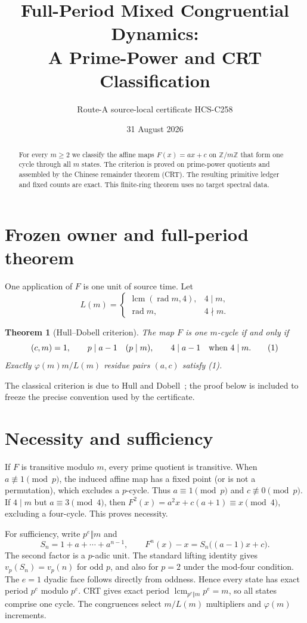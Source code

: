 \documentclass[10pt]{article}
\title{Full-Period Mixed Congruential Dynamics:\\
A Prime-Power and CRT Classification}
\author{Route-A source-local certificate HCS-C258}
\date{31 August 2026}
\newtheorem{theorem}{Theorem}
\newcommand{\Z}{\mathbb Z}
\begin{document}
\maketitle
\begin{abstract}
For every $m\ge2$ we classify the affine maps
$F(x)=ax+c$ on $\Z/m\Z$ that form one cycle through all $m$ states.
The criterion is proved on prime-power quotients and assembled by the Chinese
remainder theorem (CRT).  The resulting primitive ledger and fixed counts are
exact.  This finite-ring theorem uses no target spectral data.
\end{abstract}

\section{Frozen owner and full-period theorem}
One application of $F$ is one unit of source time.  Let
\[
 L(m)=
 \begin{cases}
 \operatorname{lcm}(\operatorname{rad}m,4),&4\mid m,\\
 \operatorname{rad}m,&4\nmid m.
 \end{cases}
\]
\begin{theorem}[Hull--Dobell criterion]
The map $F$ is one $m$-cycle if and only if
\[
 (c,m)=1,\qquad p\mid a-1\quad(p\mid m),\qquad
 4\mid a-1\quad\hbox{when }4\mid m.                 \tag{1}
\]
Exactly $\varphi(m)m/L(m)$ residue pairs $(a,c)$ satisfy (1).
\end{theorem}
The classical criterion is due to Hull and Dobell~\cite{HD}; the proof below
is included to freeze the precise convention used by the certificate.

\section{Necessity and sufficiency}
If $F$ is transitive modulo $m$, every prime quotient is transitive.  When
$a\not\equiv1\pmod p$, the induced affine map has a fixed point (or is not
a permutation), which excludes a $p$-cycle.  Thus $a\equiv1\pmod p$ and
$c\not\equiv0\pmod p$.  If $4\mid m$ but $a\equiv3\pmod4$, then
$F^2(x)=a^2x+c(a+1)\equiv x\pmod4$, excluding a four-cycle.  This proves
necessity.

For sufficiency, write $p^e\Vert m$ and
\[
 S_n=1+a+\cdots+a^{n-1},\qquad
 F^n(x)-x=S_n\bigl((a-1)x+c\bigr).                   \tag{2}
\]
The second factor is a $p$-adic unit.  The standard lifting identity gives
$v_p(S_n)=v_p(n)$ for odd $p$, and also for $p=2$ under the mod-four
condition.  The $e=1$ dyadic face follows directly from oddness.  Hence every
state has exact period $p^e$ modulo $p^e$.  CRT gives exact period
$\operatorname{lcm}_{p^e\Vert m}p^e=m$, so all states comprise one cycle.
The congruences select $m/L(m)$ multipliers and $\varphi(m)$ increments.
\end{document}
